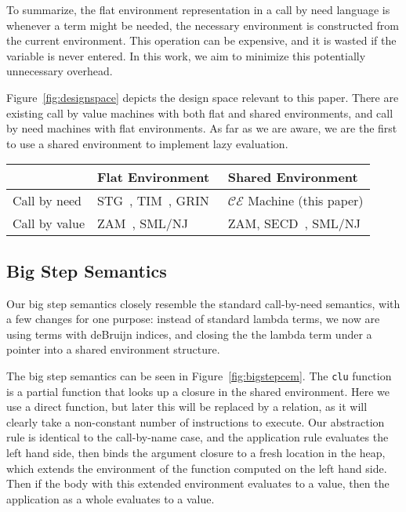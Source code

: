 To summarize, the flat environment representation in a call by need language is
whenever a term might be needed, the necessary environment is constructed from
the current environment.  This operation can be expensive, and it is wasted if
the variable is never entered. In this work, we aim to minimize this potentially
unnecessary overhead.

Figure~\ref{fig:designspace} depicts the design space relevant to this paper.
There are existing call by value machines with both flat and shared
environments, and call by need machines with flat environments. As far as we are
aware, we are the first to use a shared environment to implement lazy
evaluation.

\begin{figure*}
\begin{tabularx}{\textwidth}{l | X | X}
                & Flat Environment     & Shared Environment \\ \hline
  Call by need  & STG~\cite{jonesstg}, 
                  TIM~\cite{TIM}, 
                  GRIN~\cite{boquist1997grin} 
                & $\mathcal{CE}$ Machine (this paper) \\
  Call by value & ZAM~\cite{leroy1990zinc}, 
                  SML/NJ~\cite{appel1991standard}
                & ZAM,
                  SECD~\cite{landin1964mechanical}, 
                  SML/NJ \\
\end{tabularx}
\caption{Evaluation strategy and environment structure design space. Each
acronym refers to an existing implementation. Some implementations use multiple
environment representations.}
\label{fig:designspace}
\end{figure*}

\subsection{Big Step Semantics}

Our big step semantics closely resemble the standard call-by-need semantics,
with a few changes for one purpose: instead of standard lambda terms, we now are
using terms with deBruijn indices, and closing the the lambda term under a
pointer into a shared environment structure.  

The big step semantics can be seen in Figure~\ref{fig:bigstepcem}. The
\texttt{clu} function is a partial function that looks up a closure in the
shared environment. Here we use a direct function, but later this will be
replaced by a relation, as it will clearly take a non-constant number of
instructions to execute. Our abstraction rule is identical to the call-by-name
case, and the application rule evaluates the left hand side, then binds the
argument closure to a fresh location in the heap, which extends the environment
of the function computed on the left hand side. Then if the body with this
extended environment evaluates to a value, then the application as a whole
evaluates to a value.

